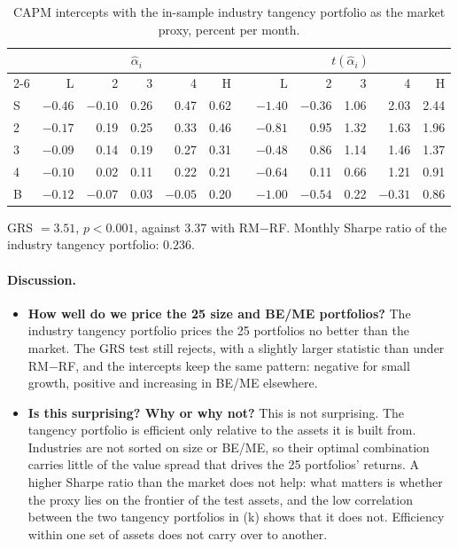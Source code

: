 \begin{table}[H]
\centering
\caption{CAPM intercepts with the in-sample industry tangency portfolio as
the market proxy, percent per month.}
\small
\begin{tabular}{lrrrrrcrrrrr}
\toprule
& \multicolumn{5}{c}{$\hat\alpha_i$} && \multicolumn{5}{c}{$t(\hat\alpha_i)$} \\
\cmidrule{2-6}\cmidrule{8-12}
& L & 2 & 3 & 4 & H && L & 2 & 3 & 4 & H \\
\midrule
S & $-0.46$ & $-0.10$ & 0.26 & 0.47 & 0.62 && $-1.40$ & $-0.36$ & 1.06 & 2.03 & 2.44 \\
2 & $-0.17$ & 0.19 & 0.25 & 0.33 & 0.46 && $-0.81$ & 0.95 & 1.32 & 1.63 & 1.96 \\
3 & $-0.09$ & 0.14 & 0.19 & 0.27 & 0.31 && $-0.48$ & 0.86 & 1.14 & 1.46 & 1.37 \\
4 & $-0.10$ & 0.02 & 0.11 & 0.22 & 0.21 && $-0.64$ & 0.11 & 0.66 & 1.21 & 0.91 \\
B & $-0.12$ & $-0.07$ & 0.03 & $-0.05$ & 0.20 && $-1.00$ & $-0.54$ & 0.22 & $-0.31$ & 0.86 \\
\bottomrule
\end{tabular}
\label{tab:p3i}
\vspace{2pt}\begin{minipage}{0.93\textwidth}\footnotesize
GRS $= 3.51$, $p < 0.001$, against $3.37$ with RM$-$RF. Monthly Sharpe
ratio of the industry tangency portfolio: $0.236$.
\end{minipage}
\end{table}

\paragraph{Discussion.}
\begin{itemize}
\setlength{\itemsep}{4pt}\setlength{\parskip}{0pt}

\item \textbf{How well do we price the 25 size and BE/ME portfolios?}
The industry tangency portfolio prices the 25 portfolios no better than the
market. The GRS test still rejects, with a slightly larger
statistic than under RM$-$RF, and the intercepts keep the same pattern:
negative for small growth, positive and increasing in BE/ME elsewhere.

\item \textbf{Is this surprising? Why or why not?} This is not
surprising. The tangency portfolio is efficient
only relative to the assets it is built from. Industries are not sorted on
size or BE/ME, so their optimal combination carries little of the value
spread that drives the 25 portfolios' returns. A higher Sharpe ratio than
the market does not help: what matters is whether the proxy lies on the
frontier of the test assets, and the low correlation between the two tangency portfolios in (k) shows that it does not. Efficiency within one set of assets does not carry over to another.

\end{itemize}

